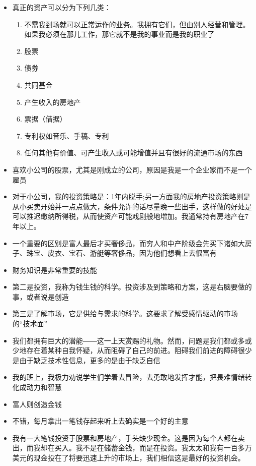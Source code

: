 \documentclass[UTF8,a4paper,8pt]{ctexbook}
\begin{document}
\begin{itemize}
			\item 真正的资产可以分为下列几类：
				\begin{enumerate}
					\item 不需我到场就可以正常运作的业务。我拥有它们，但由别人经营和管理。如果我必须在那儿工作，那它就不是我的事业而是我的职业了
					\item 股票
					\item 债券
					\item 共同基金
					\item 产生收入的房地产
					\item 票据（借据）
					\item 专利权如音乐、手稿、专利
					\item 任何其他有价值、可产生收入或可能增值并且有很好的流通市场的东西
				\end{enumerate}
			\item 喜欢小公司的股票，尤其是刚成立的公司，原因是我是一个企业家而不是一个雇员
			\item 对于小公司，我的投资策略是：1年内脱手;另一方面我的房地产投资策略则是从小买卖开始并一点点做大，条件允许的话尽量晚一些出手，这样做的好处是可以推迟缴纳所得税，从而使资产可能戏剧般地增加。我通常持有房地产在7年以上。
			\item 一个重要的区别是富人最后才买奢侈品，而穷人和中产阶级会先买下诸如大房子、珠宝、皮衣、宝石、游艇等奢侈品，因为他们想看上去很富有
			\item 财务知识是非常重要的技能
			\item 第二是投资，我称为钱生钱的科学。投资涉及到策略和方案，这是右脑要做的事，或者说是创造
			\item 第三是了解市场，它是供给与需求的科学。这要求了解受感情驱动的市场的“技术面”
			\item 我们都拥有巨大的潜能――这一上天赏赐的礼物。然而，问题是我们都或多或少地存在着某种自我怀疑，从而阻碍了自己的前进。阻碍我们前进的障碍很少是由于缺乏技术性信息，更多的是由于缺乏自信
			\item 我的班上，我极力劝说学生们学着去冒险，去勇敢地发挥才能，把畏难情绪转化成动力和智慧
			\item 富人则创造金钱
			\item 不错，每月拿出一笔钱存起来听上去确实是一个好的主意
			\item 我有一大笔钱投资于股票和房地产，手头缺少现金。这是因为每个人都在卖出，而我却在买入。我不是在储蓄金钱，而是在投资。我太太和我有一百多万美元的现金投在了将要迅速上升的市场上，我们相信这是最好的投资机会。

\end{itemize}
\end{document}
